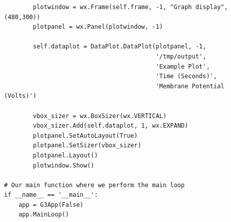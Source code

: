 \documentclass[10pt]{article}
\begin{document}
\begin{verbatim}
        plotwindow = wx.Frame(self.frame, -1, "Graph display", (480,300))
        plotpanel = wx.Panel(plotwindow, -1)

        self.dataplot = DataPlot.DataPlot(plotpanel, -1,
                                          '/tmp/output',
                                          'Example Plot',
                                          'Time (Seconds)',
                                          'Membrane Potential (Volts)')

        vbox_sizer = wx.BoxSizer(wx.VERTICAL)
        vbox_sizer.Add(self.dataplot, 1, wx.EXPAND)
        plotpanel.SetAutoLayout(True)
        plotpanel.SetSizer(vbox_sizer)
        plotpanel.Layout()
        plotwindow.Show()

# Our main function where we perform the main loop
if __name__ == '__main__':
    app = G3App(False)
    app.MainLoop()
\end{verbatim}
\end{document}
